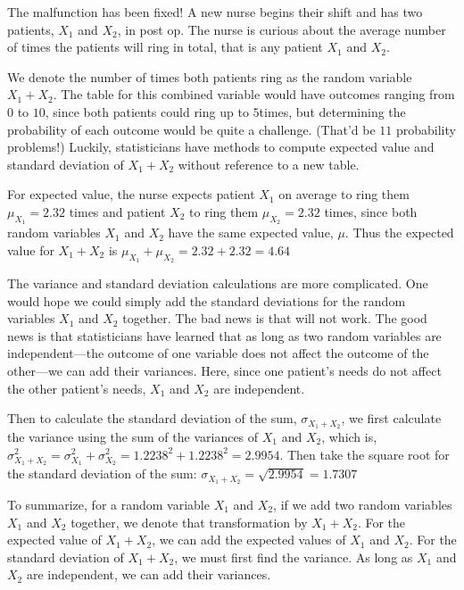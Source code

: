 \begin{example}
The malfunction has been fixed! A new nurse begins their shift and has two patients, \(X_{1}\) and  \(X_{2}\), in post op. The nurse is curious about the average number of times the patients will ring in total, that is any patient  \(X_{1}\) and  \(X_{2}\).

We denote the number of times both patients ring as the random variable  \(X_{1}+X_{2}\). The table for this combined variable would have outcomes ranging from \(0\) to \(10\), since both patients could ring up to  \(5\)times, but determining the probability of each outcome would be quite a challenge. (That'd be  \(11\) probability problems!) Luckily, statisticians have methods to compute expected value and standard deviation of  \(X_{1}+X_{2}\) without reference to a new table.

For expected value, the nurse expects patient \( X_{1} \) on average to ring them  \(\mu_{X_{1}}=2.32\) times and patient 
\( X_{2} \) to ring them \( \mu_{ X_{2} }=2.32\) times, since both random variables \(X_{1}\) and \(X_{2}\) have the same expected value,  \(\mu\). Thus the expected value for  \(X_{1}+X_{2}\) is \(\mu_{X_{1}}+\mu_{X_{2}}=2.32+2.32=4.64\) 

The variance and standard deviation calculations are more complicated. One would hope we could simply add the standard deviations for the random variables  \(X_{1}\) and \(X_{2}\) together. The bad news is that will not work. The good news is that statisticians have learned that as long as two random variables are independent---the outcome of one variable does not affect the outcome of the other---we can add their variances. Here, since one patient's needs do not affect the other patient's needs,  \(X_{1}\) and \(X_{2}\) are independent.

Then to calculate the standard deviation of the sum, \(\sigma_{X_{1}+X_{2}}\), we first calculate the variance using the sum of the variances of  \(X_{1}\) and  \(X_{2}\), which is,
\(\sigma^2_{X_{1}+X_{2}}=\sigma^2_{X_{1}}+\sigma^2_{X_{2}}=1.2238^2+1.2238^2=2.9954\).
Then take the square root for the standard deviation of the sum: \(\sigma_{X_{1}+X_{2}}=\sqrt{2.9954}=1.7307\)
\end{example}

To summarize, for a random variable  \(X_{1}\) and  \(X_{2}\), if we add two random variables  \(X_{1}\) and  \(X_{2}\) together, we denote that transformation by  \(X_{1}+X_{2}\). 
For the expected value of \(X_{1}+X_{2}\), we can add the expected values of  \(X_{1}\) and  \(X_{2}\). For the standard deviation of \(X_{1}+X_{2}\), we must first find the variance. As long as  \(X_{1}\) and  \(X_{2}\) are independent, we can add their variances.

